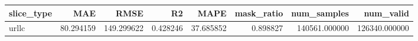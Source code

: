 \begin{tabular}{lrrrrrrr}
\toprule
slice_type & MAE & RMSE & R2 & MAPE & mask_ratio & num_samples & num_valid \\
\midrule
urllc & 80.294159 & 149.299622 & 0.428246 & 37.685852 & 0.898827 & 140561.000000 & 126340.000000 \\
\bottomrule
\end{tabular}
